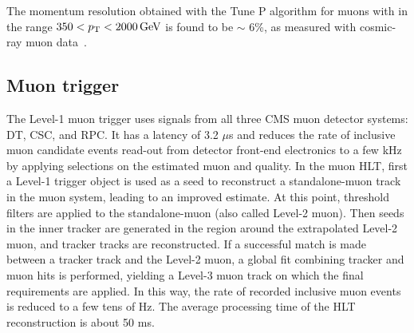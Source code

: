 The momentum resolution obtained with the Tune P algorithm for muons with \pt in the range $350 < p_{\mathrm{T}} < 2000\,\text{Ge\hspace{-.08em}V}$ is found to be $\sim$ 6\%, as measured with cosmic-ray muon data~\cite{Chatrchyan:2012xi,Radogna:2205870}.


\subsection{Muon trigger}

The Level-1 muon trigger uses signals from all three CMS muon detector systems: DT, CSC, and RPC. It has a latency of 3.2 $\mu$s and reduces the rate of inclusive muon candidate events read-out from detector front-end electronics to a few kHz by applying selections on the estimated muon \pt and quality.
In the muon HLT, first a Level-1 trigger object is used as a seed to reconstruct a standalone-muon track in the muon system, leading to an improved \pt estimate. At this point, \pt threshold filters are applied to the standalone-muon (also called Level-2 muon). Then seeds in the inner tracker are generated in the region around the extrapolated Level-2 muon, and tracker tracks are reconstructed. If a successful match is made between a tracker track and the Level-2 muon, a global fit combining tracker and muon hits is performed, yielding a Level-3 muon track on which the final \pt requirements are applied. In this way, the rate of recorded inclusive muon events is reduced to a few tens of Hz. The average processing time of the HLT reconstruction is about 50 ms.

